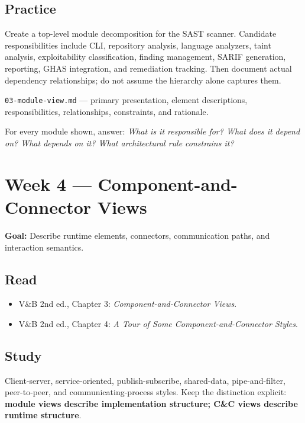 \documentclass[10pt,letterpaper]{article}
\begin{document}
\subsection{Practice}
Create a top-level module decomposition for the SAST scanner. Candidate responsibilities include CLI, repository analysis, language analyzers, taint analysis, exploitability classification, finding management, SARIF generation, reporting, GHAS integration, and remediation tracking. Then document actual dependency relationships; do not assume the hierarchy alone captures them.

\begin{deliverablebox}
\texttt{03-module-view.md} --- primary presentation, element descriptions, responsibilities, relationships, constraints, and rationale.
\end{deliverablebox}

\begin{masterybox}
For every module shown, answer: \emph{What is it responsible for? What does it depend on? What depends on it? What architectural rule constrains it?}
\end{masterybox}

\section{Week 4 --- Component-and-Connector Views}

\textbf{Goal:} Describe runtime elements, connectors, communication paths, and interaction semantics.

\subsection{Read}
\begin{itemize}
  \item V\&B 2nd ed., Chapter 3: \emph{Component-and-Connector Views}.
  \item V\&B 2nd ed., Chapter 4: \emph{A Tour of Some Component-and-Connector Styles}.
\end{itemize}

\subsection{Study}
Client-server, service-oriented, publish-subscribe, shared-data, pipe-and-filter, peer-to-peer, and communicating-process styles. Keep the distinction explicit: \textbf{module views describe implementation structure; C\&C views describe runtime structure}.
\end{document}
